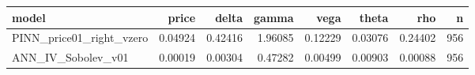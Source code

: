 \begin{tabular}{lrrrrrrr}
\toprule
model & price & delta & gamma & vega & theta & rho & n \\
\midrule
PINN_price01_right_vzero & 0.04924 & 0.42416 & 1.96085 & 0.12229 & 0.03076 & 0.24402 & 956 \\
ANN_IV_Sobolev_v01 & 0.00019 & 0.00304 & 0.47282 & 0.00499 & 0.00903 & 0.00088 & 956 \\
\bottomrule
\end{tabular}
